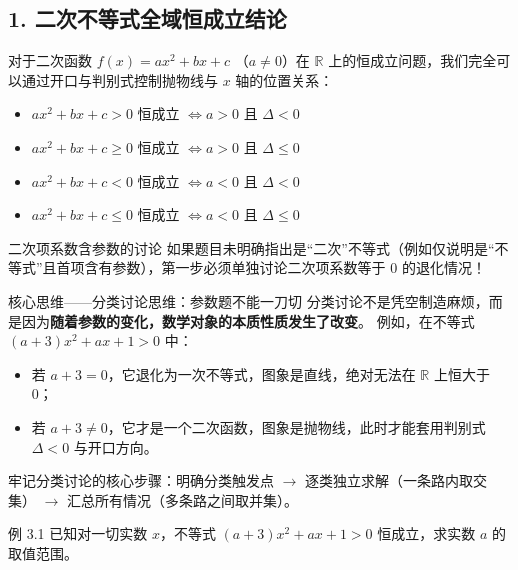 \documentclass[11pt,a4paper]{ctexart}
\begin{document}
\subsection{1. 二次不等式全域恒成立结论}
对于二次函数 $f(x)=ax^2+bx+c$ （$a \ne 0$）在 $\mathbb R$ 上的恒成立问题，我们完全可以通过开口与判别式控制抛物线与 $x$ 轴的位置关系：
\begin{itemize}
  \item $ax^2+bx+c > 0$ 恒成立 $\Longleftrightarrow a>0$ 且 $\Delta < 0$
  \item $ax^2+bx+c \ge 0$ 恒成立 $\Longleftrightarrow a>0$ 且 $\Delta \le 0$
  \item $ax^2+bx+c < 0$ 恒成立 $\Longleftrightarrow a<0$ 且 $\Delta < 0$
  \item $ax^2+bx+c \le 0$ 恒成立 $\Longleftrightarrow a<0$ 且 $\Delta \le 0$
\end{itemize}

\begin{warnbox}{二次项系数含参数的讨论}
如果题目未明确指出是“二次”不等式（例如仅说明是“不等式”且首项含有参数），第一步必须单独讨论二次项系数等于 0 的退化情况！
\end{warnbox}

\begin{keybox}{核心思维——分类讨论思维：参数题不能一刀切}
分类讨论不是凭空制造麻烦，而是因为\textbf{随着参数的变化，数学对象的本质性质发生了改变}。
例如，在不等式 $(a+3)x^2+ax+1 > 0$ 中：
\begin{itemize}
  \item 若 $a+3 = 0$，它退化为一次不等式，图象是直线，绝对无法在 $\mathbb{R}$ 上恒大于 0；
  \item 若 $a+3 \ne 0$，它才是一个二次函数，图象是抛物线，此时才能套用判别式 $\Delta < 0$ 与开口方向。
\end{itemize}
牢记分类讨论的核心步骤：明确分类触发点 $\rightarrow$ 逐类独立求解（一条路内取交集） $\rightarrow$ 汇总所有情况（多条路之间取并集）。
\end{keybox}

\begin{exbox}{例 3.1}
已知对一切实数 $x$，不等式 $(a+3)x^2+ax+1 > 0$ 恒成立，求实数 $a$ 的取值范围。
\end{exbox}
\end{document}
